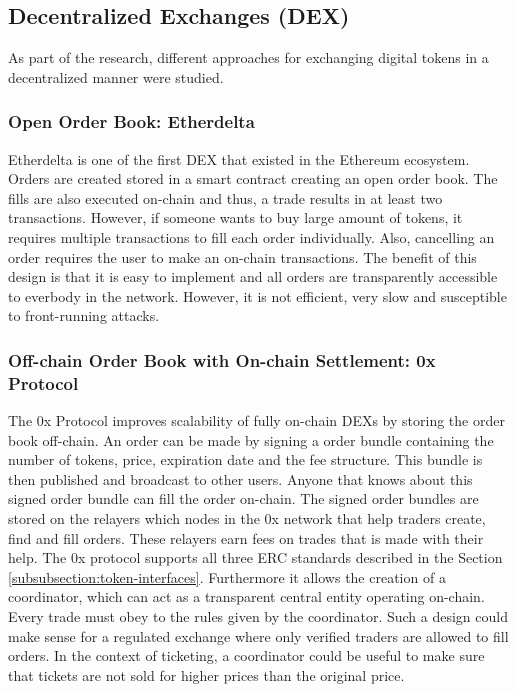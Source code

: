 
\subsection{Decentralized Exchanges (DEX)}\label{subsection:dex}

As part of the research, different approaches for exchanging digital tokens in a decentralized manner were studied.

\subsubsection{Open Order Book: Etherdelta}
Etherdelta is one of the first DEX that existed in the Ethereum ecosystem. Orders are created stored in a smart contract creating an open order book. The fills are also executed on-chain and thus, a trade results in at least two transactions. However, if someone wants to buy large amount of tokens, it requires multiple transactions to fill each order individually. Also, cancelling an order requires the user to make an on-chain transactions. The benefit of this design is that it is easy to implement and all orders are transparently accessible to everbody in the network. However, it is not efficient, very slow and susceptible to front-running attacks. 

\subsubsection{Off-chain Order Book with On-chain Settlement: 0x Protocol}

The 0x Protocol improves scalability of fully on-chain DEXs by storing the order book off-chain. An order can be made by signing a order bundle containing the number of tokens, price, expiration date and the fee structure. This bundle is then published and broadcast to other users. Anyone that knows about this signed order bundle can fill the order on-chain. The signed order bundles are stored on the relayers which nodes in the 0x network that help traders create, find and fill orders. These relayers earn fees on trades that is made with their help. The 0x protocol supports all three ERC standards described in the Section \ref{subsubsection:token-interfaces}. Furthermore it allows the creation of a coordinator, which can act as a transparent central entity operating on-chain. Every trade must obey to the rules given by the coordinator. Such a design could make sense for a regulated exchange where only verified traders are allowed to fill orders. In the context of ticketing, a coordinator could be useful to make sure that tickets are not sold for higher prices than the original price. 

